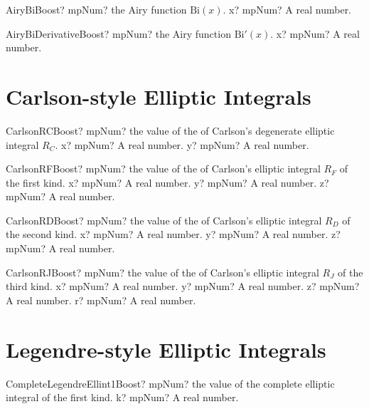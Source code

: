 \documentclass[12pt,a4paper,openany]{book}
\begin{document}
\begin{mpFunctionsExtract}
\mpFunctionOne
{AiryBiBoost? mpNum? the Airy function $\text{Bi}(x)$.}
{x? mpNum? A real number.}
\end{mpFunctionsExtract}

\begin{mpFunctionsExtract}
\mpFunctionOne
{AiryBiDerivativeBoost? mpNum? the Airy function $\text{Bi}'(x)$.}
{x? mpNum? A real number.}
\end{mpFunctionsExtract}

\section{Carlson-style Elliptic Integrals}

\begin{mpFunctionsExtract}
\mpFunctionTwo
{CarlsonRCBoost? mpNum? the value of the of Carlson's degenerate elliptic integral $R_C$.}
{x? mpNum? A real number.}
{y? mpNum? A real number.}
\end{mpFunctionsExtract}

\begin{mpFunctionsExtract}
\mpFunctionThree
{CarlsonRFBoost? mpNum? the value of the of Carlson's elliptic integral $R_F$ of the first kind.}
{x? mpNum? A real number.}
{y? mpNum? A real number.}
{z? mpNum? A real number.}
\end{mpFunctionsExtract}

\begin{mpFunctionsExtract}
\mpFunctionThree
{CarlsonRDBoost? mpNum? the value of the of Carlson's elliptic integral $R_D$ of the second kind.}
{x? mpNum? A real number.}
{y? mpNum? A real number.}
{z? mpNum? A real number.}
\end{mpFunctionsExtract}

\begin{mpFunctionsExtract}
\mpFunctionFour
{CarlsonRJBoost? mpNum? the value of the of Carlson's elliptic integral $R_J$ of the third kind.}
{x? mpNum? A real number.}
{y? mpNum? A real number.}
{z? mpNum? A real number.}
{r? mpNum? A real number.}
\end{mpFunctionsExtract}

\section{Legendre-style Elliptic Integrals}

\begin{mpFunctionsExtract}

\mpFunctionOne
{CompleteLegendreEllint1Boost? mpNum? the value of the complete elliptic integral of the first kind.}
{k? mpNum? A real number.}
\end{mpFunctionsExtract}
\end{document}
